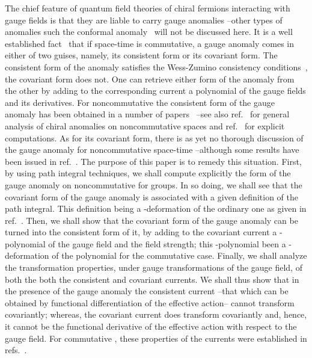 \documentclass[a4paper,12pt]{article}
\def\RR{{\rm I\!\!\, R}}
\begin{document}
The chief feature of quantum field theories of chiral fermions interacting 
with gauge fields is that they are liable to carry gauge anomalies --other 
types of anomalies such the conformal anomaly~\cite{Nakajima:2001uh} will not 
be discussed here.
It is a well 
established fact~\cite{Alvarez-Gaume:1984cs, Fujikawa:1984bg, Bardeen:1984pm,  
Alvarez-Gaume:1985dr, Fujikawa:1985pt, Banerjee:1986bu, Banerjee:1999up}
 that if space-time is  
commutative, a gauge anomaly comes in either of two guises, namely,
its consistent form or its covariant form. The consistent form of the anomaly
satisfies the Wess-Zumino consistency conditions~\cite{Wess:1971yu},  
the covariant form does not.
One can retrieve  either form of the anomaly from the other by adding 
to the corresponding current a polynomial of the gauge fields and its 
derivatives. For noncommutative \myHighlight{$\RR^4$}\coordHE{} the consistent form of the gauge 
anomaly has been obtained in a number of papers~\cite{Gracia-Bondia:2000pz, Bonora:2000he, Grisaru:2001sk} --see also 
ref.~\cite{Langmann:1995ub, Perrot:1999vc, Harvey:2001pd} for general 
analysis of chiral anomalies on noncommutative spaces and 
ref.~\cite{Ardalan:2001cy, Ardalan:2000qk} for explicit computations. 
As for its covariant form, there is as yet no thorough discussion of the
gauge anomaly for noncommutative space-time --although some results have 
been issued in ref.~\cite{Martin:2001wc}. The purpose of this paper is to
remedy this situation. First, by using path integral techniques,  we shall   
compute explicitly the form of the gauge anomaly on noncommutative 
\myHighlight{$\RR^{2 n}$}\coordHE{} for \coordHE{} groups. In so doing, we shall see that the covariant 
form of the gauge anomaly is associated with a given 
definition of the path integral. This definition being a \myHighlight{$*\!$}\coordHE{}-deformation of
the ordinary one as given in ref.~\cite{Fujikawa:1984bg, Banerjee:1986bu, 
 Banerjee:1999up}. Then, we
shall show that the covariant form of the gauge anomaly can be turned 
into the  consistent form of it, by adding to the covariant 
current a \myHighlight{$*\!$}\coordHE{}-polynomial of the gauge field and the field strength; this 
\myHighlight{$*\!$}\coordHE{}-polynomial been a \myHighlight{$*\!$}\coordHE{}-deformation of the polynomial for the commutative 
\myHighlight{$\RR^{2 n}$}\coordHE{} case. Finally, we shall analyze the transformation properties, 
under gauge transformations of the gauge field, of both
the  both the consistent and covariant currents. We shall thus show that 
in the presence of the gauge anomaly the consistent current --that which 
can be obtained by functional differentiation of the effective action--  cannot 
transform covariantly; whereas, the covariant current does transform 
covariantly and, hence,  it cannot be  the functional derivative  of 
the effective action with respect to the gauge field. 
For  commutative \myHighlight{$\RR^{2 n}$}\coordHE{}, these properties of the currents were 
established in refs.~\cite{Bardeen:1984pm, Alvarez-Gaume:1985dr, Banerjee:1986bu, Banerjee:1999up}.
\end{document}
